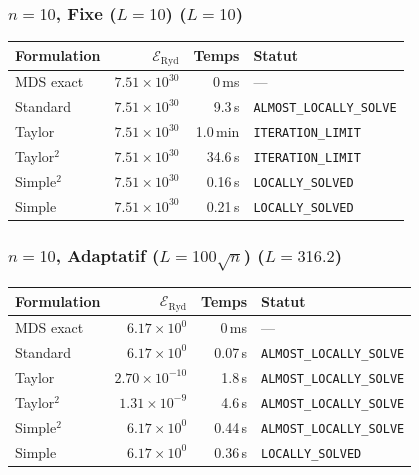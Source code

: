 \subsubsection{$n=10$, Fixe ($L{=}10$) ($L=10$)}
\begin{longtable}{@{}lrrl@{}}
  \toprule
  Formulation & $\mathcal{E}_{\mathrm{Ryd}}$ & Temps & Statut \\
  \midrule
  \endhead
  MDS exact & $7.51\times10^{30}$ & 0\,ms & --- \\
  Standard & $7.51\times10^{30}$ & 9.3\,s & \texttt{ALMOST\_LOCALLY\_SOLVE} \\
  Taylor & $7.51\times10^{30}$ & 1.0\,min & \texttt{ITERATION\_LIMIT} \\
  Taylor$^2$ & $7.51\times10^{30}$ & 34.6\,s & \texttt{ITERATION\_LIMIT} \\
  Simple$^2$ & $7.51\times10^{30}$ & 0.16\,s & \texttt{LOCALLY\_SOLVED} \\
  Simple & $7.51\times10^{30}$ & 0.21\,s & \texttt{LOCALLY\_SOLVED} \\
  \bottomrule
\end{longtable}

\subsubsection{$n=10$, Adaptatif ($L{=}100\sqrt{n}$) ($L=316.2$)}
\begin{longtable}{@{}lrrl@{}}
  \toprule
  Formulation & $\mathcal{E}_{\mathrm{Ryd}}$ & Temps & Statut \\
  \midrule
  \endhead
  MDS exact & $6.17\times10^{0}$ & 0\,ms & --- \\
  Standard & $6.17\times10^{0}$ & 0.07\,s & \texttt{ALMOST\_LOCALLY\_SOLVE} \\
  Taylor & $2.70\times10^{-10}$ & 1.8\,s & \texttt{ALMOST\_LOCALLY\_SOLVE} \\
  Taylor$^2$ & $1.31\times10^{-9}$ & 4.6\,s & \texttt{ALMOST\_LOCALLY\_SOLVE} \\
  Simple$^2$ & $6.17\times10^{0}$ & 0.44\,s & \texttt{ALMOST\_LOCALLY\_SOLVE} \\
  Simple & $6.17\times10^{0}$ & 0.36\,s & \texttt{LOCALLY\_SOLVED} \\
  \bottomrule
\end{longtable}

